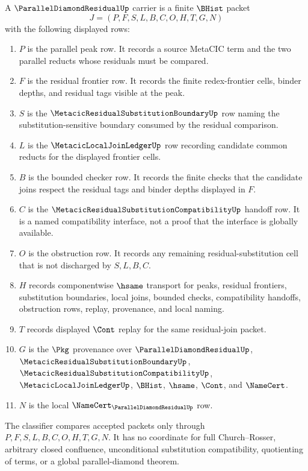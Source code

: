 \begin{definition}
\label{def:parallel-diamond-residual-carrier}
A $\ParallelDiamondResidualUp$ carrier is a finite $\BHist$ packet
$$
J=(P,F,S,L,B,C,O,H,T,G,N)
$$
with the following displayed rows:
\begin{enumerate}
\item $P$ is the parallel peak row. It records a source MetaCIC term and the two parallel reducts whose residuals must be compared.
\item $F$ is the residual frontier row. It records the finite redex-frontier cells, binder depths, and residual tags visible at the peak.
\item $S$ is the $\MetacicResidualSubstitutionBoundaryUp$ row naming the substitution-sensitive boundary consumed by the residual comparison.
\item $L$ is the $\MetacicLocalJoinLedgerUp$ row recording candidate common reducts for the displayed frontier cells.
\item $B$ is the bounded checker row. It records the finite checks that the candidate joins respect the residual tags and binder depths displayed in $F$.
\item $C$ is the $\MetacicResidualSubstitutionCompatibilityUp$ handoff row. It is a named compatibility interface, not a proof that the interface is globally available.
\item $O$ is the obstruction row. It records any remaining residual-substitution cell that is not discharged by $S,L,B,C$.
\item $H$ records componentwise $\hsame$ transport for peaks, residual frontiers, substitution boundaries, local joins, bounded checks, compatibility handoffs, obstruction rows, replay, provenance, and local naming.
\item $T$ records displayed $\Cont$ replay for the same residual-join packet.
\item $G$ is the $\Pkg$ provenance over $\ParallelDiamondResidualUp$, $\MetacicResidualSubstitutionBoundaryUp$, $\MetacicResidualSubstitutionCompatibilityUp$, $\MetacicLocalJoinLedgerUp$, $\BHist$, $\hsame$, $\Cont$, and $\NameCert$.
\item $N$ is the local $\NameCert_{\ParallelDiamondResidualUp}$ row.
\end{enumerate}
The classifier compares accepted packets only through $P,F,S,L,B,C,O,H,T,G,N$. It has no coordinate for full Church--Rosser, arbitrary closed confluence, unconditional substitution compatibility, quotienting of terms, or a global parallel-diamond theorem.
\end{definition}

